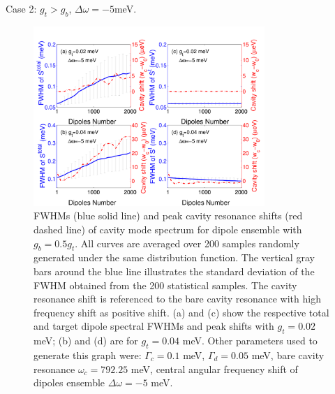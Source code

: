 \documentclass{beamer}
\begin{document}
\begin{frame}{Case 2: $ g_t>g_b $, $ \Delta\omega=-5 $meV.}
\begin{figure}[H]%
\centering
\begin{center}
\includegraphics[width=0.78\textwidth]{./Figs/fwhm_wdrand5s20_gt0dot2-0dot4_qd2000_stat200}
\end{center}
\caption[Spectral modification of a cavity with a target dipole and an ensemble.]{  FWHMs (blue solid line) and peak cavity resonance shifts (red dashed line) of cavity mode spectrum for dipole ensemble with $g_b=0.5g_t$. All curves are averaged over 200 samples randomly generated under the same distribution function. The vertical gray bars around the blue line illustrates the standard deviation of the FWHM obtained from the 200 statistical samples. The cavity resonance shift is referenced to the bare cavity resonance with high frequency shift as positive shift. (a) and (c) show the respective total and target dipole spectral FWHMs and peak shifts with $g_t=0.02$ meV; (b) and (d) are for $g_t=0.04$ meV. Other parameters used to generate this graph were: $\Gamma_c=0.1$ meV, $\Gamma_{d}=0.05$ meV, bare cavity resonance $\omega_c=792.25$ meV, central angular frequency shift of dipoles ensemble $\Delta\omega=-5$ meV. }
\label{fwhm_wdrand5s20_gt0.2-0.4_qd2000_stat200}
\end{figure}
\end{frame}
\end{document}
